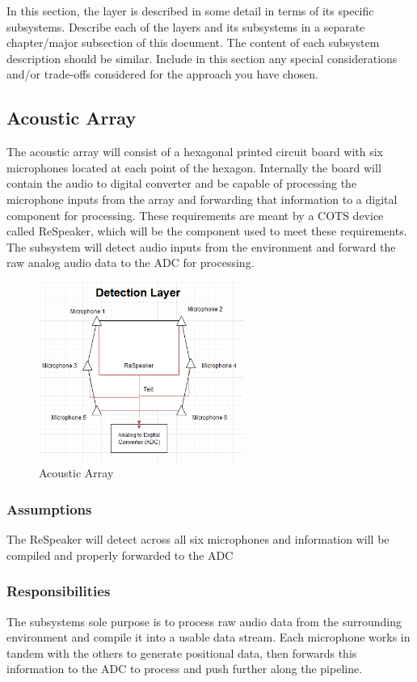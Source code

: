 In this section, the layer is described in some detail in terms of its specific subsystems. Describe each of the layers and its subsystems in a separate chapter/major subsection of this document. The content of each subsystem description should be similar. Include in this section any special considerations and/or trade-offs considered for the approach you have chosen.

\subsection{Acoustic Array}
The acoustic array will consist of a hexagonal printed circuit board with six microphones located at each point of the hexagon. Internally the board will contain the audio to digital converter and be capable of processing the microphone inputs from the array and forwarding that information to a digital component for processing. These requirements are meant by a COTS device called ReSpeaker, which will be the component used to meet these requirements. The subsystem will detect audio inputs from the environment and forward the raw analog audio data to the ADC for processing.

\begin{figure}[h!]
	\centering
 	\includegraphics[width=0.60\textwidth]{images/acoustarray}
 \caption{Acoustic Array}
\end{figure}

\subsubsection{Assumptions}
The ReSpeaker will detect across all six microphones and information will be compiled and properly forwarded to the ADC

\subsubsection{Responsibilities}
The subsystems sole purpose is to process raw audio data from the surrounding environment and compile it into a usable data stream. Each microphone works in tandem with the others to generate positional data, then forwards this information to the ADC to process and push further along the pipeline.

